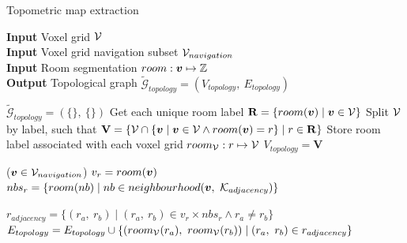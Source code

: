 \begin{algorithm}
    \caption{Topometric map extraction}
    \hspace*{\algorithmicindent} \textbf{Input} Voxel grid \(\mathcal{V}\) \\
    \hspace*{\algorithmicindent} \textbf{Input} Voxel grid navigation subset \(\mathcal{V}_{navigation}\) \\
    \hspace*{\algorithmicindent} \textbf{Input} Room segmentation \(room: \boldsymbol{v} \mapsto \mathbb{Z}\) \\
    \hspace*{\algorithmicindent} \textbf{Output} Topological graph \(\widetilde{\mathcal{G}}_{topology} = (V_{topology},\ E_{topology})\) \\

    \begin{algorithmic}
    \label{algo:topo_extract}
    \State $\widetilde{\mathcal{G}}_{topology} = (\{\},\ \{\})$
    \State Get each unique room label \(\mathbf{R} = \{room(\boldsymbol{v}) \mid \boldsymbol{v} \in \mathcal{V}\}\)
    \State Split \(\mathcal{V}\) by label, such that \(\mathbf{V} = \{\mathcal{V} \cap \{\boldsymbol{v} \mid \boldsymbol{v} \in \mathcal{V} \land room(\boldsymbol{v}) = r\} \mid r \in \mathbf{R}\}\)
    \State Store room label associated with each voxel grid \(room_{\mathcal{V}}: r \mapsto \mathcal{V}\)
    \State $V_{topology} = \mathbf{V}$

    \ForEach($\boldsymbol{v} \in \mathcal{V}_{navigation}$)
        \State $v_r = room(\boldsymbol{v})$
        \State $nbs_r = \{room(nb) \mid nb \in neighbourhood(\boldsymbol{v},\ \mathcal{K}_{adjacency})\}$

        \State $r_{adjacency} = \{(r_a,\ r_b) \mid (r_a,\ r_b) \in {v_r} \times {nbs_r} \land r_a \neq r_b\}$
        \State $E_{topology} = E_{topology} \cup \{(room_{\mathcal{V}}(r_a),\ room_{\mathcal{V}}(r_b)) \mid (r_a,\ r_b) \in r_{adjacency}\}$
    \EndFor
    \end{algorithmic}
\end{algorithm}